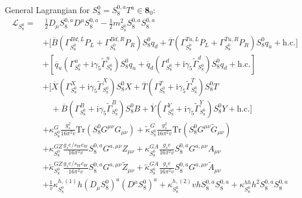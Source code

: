 \documentclass[preprintnumbers,nofootinbib,showpacs,eqsecnum,pre,12pt]{revtex4-1}
\newcommand{\adj}[1]{\overline{#1}}
\newcommand{\hc}{\text{h.c.}}
\newcommand{\Tr}{\text{Tr}}
\begin{document}
\noindent
General Lagrangian for $S_8^0=S_8^{0,a}T^a\in \mathbf 8_0$:
	\begin{align}
		\mathcal L_{S_8^0} = &~\frac 12 D_\mu S_8^{0,a} D^\mu S_8^{0,a} - \frac 12 m^2_{S_8^0} S_8^{0,a} S_8^{0,a} \nonumber \\
		& + \Big[ \adj B \left( \Gamma_{S_8^0}^{Bd,L} P_L + \Gamma_{S_8^0}^{Bd,R} P_R  \right) S_8^0 q_d + \adj T \left( \Gamma_{S_8^0}^{Tu,L} P_L + \Gamma_{S_8^0}^{Tu,R} P_R  \right) S_8^0 q_u + \hc \Big] \nonumber\\
		&+ \left[\adj q_u \left( \Gamma_{S_8^0}^u + \mathrm i \gamma_5 \tilde \Gamma_{S_8^0}^u \right) S_8^0 q_u +  \adj q_d \left( \Gamma_{S_8^0}^d + \mathrm i \gamma_5 \tilde \Gamma_{S_8^0}^d \right) S_8^0 q_d +\hc\right] \nonumber\\ 
		&+ \Big[\adj X \left( \Gamma_{S_8^0}^X + \mathrm i \gamma_5 \tilde \Gamma_{S_8^0}^X \right) S_8^0 X
		+ \adj T \left( \Gamma_{S_8^0}^T + \mathrm i \gamma_5 \tilde \Gamma_{S_8^0}^T \right) S_8^0 T \nonumber \nonumber\\
		&\quad+ \adj B \left( \Gamma_{S_8^0}^B + \mathrm i \gamma_5 \tilde \Gamma_{S_8^0}^B \right) S_8^0 B
		+ \adj Y \left( \Gamma_{S_8^0}^Y + \mathrm i \gamma_5 \tilde \Gamma_{S_8^0}^Y \right) S_8^0 Y +\hc\Big] \nonumber\\
		&+ \kappa_{S_8^0}^{G} \frac{g_s^2}{16\pi^2v} \Tr(S^0_8 G^{\mu\nu} G_{\mu\nu}) + \tilde\kappa_{S_8^0}^{G} \frac{g_s^2}{16\pi^2v} \Tr(S^0_8 G^{\mu\nu} \tilde G_{\mu\nu})\nonumber  \\
		&+ \kappa_{S_8^0}^{GZ} \frac{g_s e/s_Wc_W}{16\pi^2v} S^{0,a}_8 G^{a,\mu\nu} Z_{\mu\nu} + \kappa_{S_8^0}^{GA} \frac{g_s e}{16\pi^2v} S^{0,a}_8 G^{a,\mu\nu} A_{\mu\nu} \nonumber\\
		&+ \tilde\kappa_{S_8^0}^{GZ} \frac{g_s e/s_Wc_W}{16\pi^2v} S^{0,a}_8 G^{a,\mu\nu} \tilde Z_{\mu\nu} + \tilde\kappa_{S_8^0}^{GA} \frac{g_s e}{16\pi^2v} S^{0,a}_8 G^{a,\mu\nu} \tilde A_{\mu\nu}  \nonumber\\
		&+ \frac 1v \kappa_{S_8^0}^{h,(1)} h (D_\mu S_8^0)^a (D^\mu S_8^0)^a + \kappa_{S_8^0}^{h,(2)} vh S_8^{0,a} S_8^{0,a} + \kappa_{S_8^0} ^{hh} h^2 S_8^{0,a} S_8^{0,a}
	\end{align}
\end{document}
